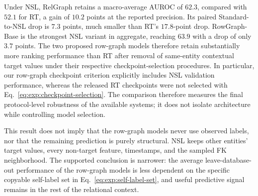 Under NSL, RelGraph retains a macro-average AUROC of \(62.3\), compared with
\(52.1\) for RT, a gain of \(10.2\) points at the reported precision. Its
paired Standard-to-NSL drop is \(7.3\) points, much
smaller than RT's \(17.8\)-point drop. RowGraph-Base is the strongest NSL
variant in aggregate, reaching \(63.9\) with a drop of only \(3.7\) points.
The two proposed row-graph models therefore retain substantially more
ranking performance than RT after removal of same-entity contextual target
values under their respective checkpoint-selection procedures. In
particular, our row-graph checkpoint criterion explicitly includes NSL
validation performance, whereas the released RT checkpoints were not
selected with Eq.~\eqref{eq:exp:checkpoint-selection}. The comparison
therefore measures the final protocol-level robustness of the available
systems; it does not isolate architecture while controlling model selection.

This result does not imply that the row-graph models never use observed
labels, nor that the remaining prediction is purely structural. NSL keeps
other entities' target values, every non-target feature, timestamps, and the
sampled FK neighborhood. The supported conclusion is narrower: the average
leave-database-out performance of the row-graph models is less dependent on
the specific copyable self-label set in
Eq.~\eqref{eq:exp:self-label-set}, and useful predictive signal remains in
the rest of the relational context.

